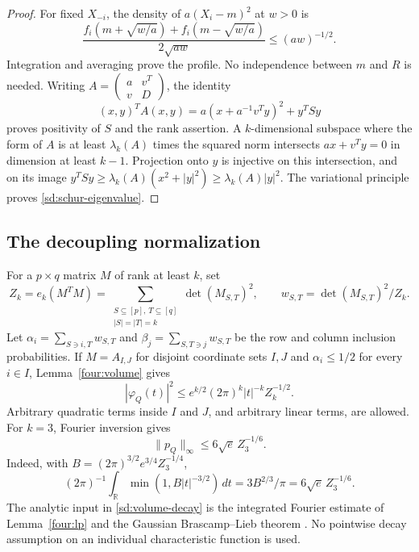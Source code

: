 \begin{proof}
For fixed $X_{-i}$, the density of $a(X_i-m)^2$ at $w>0$ is
\[
 \frac{f_i(m+\sqrt{w/a})+f_i(m-\sqrt{w/a})}{2\sqrt{aw}}
 \leq(aw)^{-1/2}.
\]
Integration and averaging prove the profile.  No independence between
$m$ and $R$ is needed.  Writing
$A=\left(\begin{smallmatrix}a&v^T\\v&D\end{smallmatrix}\right)$, the identity
\[
 (x,y)^TA(x,y)=a(x+a^{-1}v^Ty)^2+y^TSy
\]
proves positivity of $S$ and the rank assertion.
A $k$-dimensional subspace where the form of $A$ is at least
$\lambda_k(A)$ times the squared norm intersects $ax+v^Ty=0$
in dimension at least $k-1$.  Projection onto $y$ is injective on
this intersection, and on its image
$y^TSy\geq\lambda_k(A)(x^2+|y|^2)\geq\lambda_k(A)|y|^2$.
The variational principle proves \eqref{sd:schur-eigenvalue}.
\end{proof}

\subsection{The decoupling normalization}
For a $p\times q$ matrix $M$ of rank at least $k$, set
\[
 Z_k=e_k(M^TM)
 =\sum_{\substack{S\subseteq[p],\,T\subseteq[q]\\|S|=|T|=k}}
       \det(M_{S,T})^2,\qquad
 w_{S,T}=\det(M_{S,T})^2/Z_k.
\]
Let $\alpha_i=\sum_{S\ni i,T}w_{S,T}$ and
$\beta_j=\sum_{S,T\ni j}w_{S,T}$ be the row and column inclusion
probabilities.  If $M=A_{I,J}$ for disjoint coordinate sets $I,J$
and $\alpha_i\leq1/2$ for every $i\in I$, Lemma~\ref{four:volume} gives
\begin{equation}\label{sd:volume-decay}
 |\varphi_Q(t)|^2\leq
 e^{k/2}(2\pi)^k|t|^{-k}Z_k^{-1/2}.
\end{equation}
Arbitrary quadratic terms inside $I$ and $J$, and arbitrary linear
terms, are allowed.  For $k=3$, Fourier inversion gives
\begin{equation}\label{sd:volume-density}
 \|p_Q\|_\infty\leq6\sqrt e\,Z_3^{-1/6}.
\end{equation}
Indeed, with $B=(2\pi)^{3/2}e^{3/4}Z_3^{-1/4}$,
\[
 (2\pi)^{-1}\int_{\mathbb R}\min(1,B|t|^{-3/2})\,dt
 =3B^{2/3}/\pi=6\sqrt e\,Z_3^{-1/6}.
\]
The analytic input in \eqref{sd:volume-decay} is the integrated
Fourier estimate of Lemma~\ref{four:lp} and the Gaussian
Brascamp--Lieb theorem \citep{BL1976,Lieb1990}.  No pointwise decay
assumption on an individual characteristic function is used.

